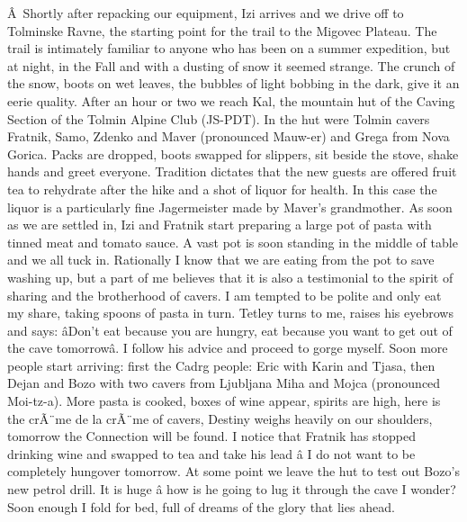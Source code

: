Â~Shortly after repacking our equipment, Izi arrives and we drive off to
Tolminske Ravne, the starting point for the trail to the Migovec
Plateau. The trail is intimately familiar to anyone who has been on a
summer expedition, but at night, in the Fall and with a dusting of snow
it seemed strange. The crunch of the snow, boots on wet leaves, the
bubbles of light bobbing in the dark, give it an eerie quality. After an
hour or two we reach Kal, the mountain hut of the Caving Section of the
Tolmin Alpine Club (JS-PDT). In the hut were Tolmin cavers Fratnik,
Samo, Zdenko and Maver (pronounced Mauw-er) and Grega from Nova Gorica.
Packs are dropped, boots swapped for slippers, sit beside the stove,
shake hands and greet everyone. Tradition dictates that the new guests
are offered fruit tea to rehydrate after the hike and a shot of liquor
for health. In this case the liquor is a particularly fine Jagermeister
made by Maver's grandmother. As soon as we are settled in, Izi and
Fratnik start preparing a large pot of pasta with tinned meat and tomato
sauce. A vast pot is soon standing in the middle of table and we all
tuck in. Rationally I know that we are eating from the pot to save
washing up, but a part of me believes that it is also a testimonial to
the spirit of sharing and the brotherhood of cavers. I am tempted to be
polite and only eat my share, taking spoons of pasta in turn. Tetley
turns to me, raises his eyebrows and says: âDon't eat because you are
hungry, eat because you want to get out of the cave tomorrowâ. I
follow his advice and proceed to gorge myself. Soon more people start
arriving: first the Cadrg people: Eric with Karin and Tjasa, then Dejan
and Bozo with two cavers from Ljubljana Miha and Mojca (pronounced
Moi-tz-a). More pasta is cooked, boxes of wine appear, spirits are high,
here is the crÃ¨me de la crÃ¨me of cavers, Destiny weighs heavily on our
shoulders, tomorrow the Connection will be found. I notice that Fratnik
has stopped drinking wine and swapped to tea and take his lead â I do
not want to be completely hungover tomorrow. At some point we leave the
hut to test out Bozo's new petrol drill. It is huge â how is he going
to lug it through the cave I wonder? Soon enough I fold for bed, full of
dreams of the glory that lies ahead.

